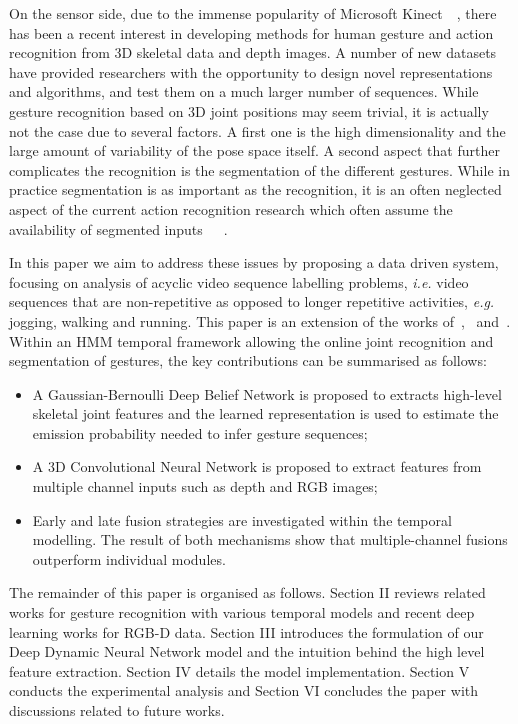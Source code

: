 On the sensor side, due to the immense popularity of Microsoft Kinect~\cite{shotton2011real}~\cite{lingshao2}, there has been a recent interest in developing methods for human gesture and action recognition from 3D skeletal data and depth images.
A number of new datasets~\cite{ICMI,fothergill2012instructing,guyon2012chalearn,wang2012mining} have provided researchers with the opportunity to design novel representations and algorithms, and test them on a much larger number of sequences.
While gesture recognition based on 3D joint positions may seem trivial, it is actually not the case due to several factors. A first one is the high dimensionality and the large amount of variability of the pose space itself.
A second aspect that further complicates the recognition is the segmentation of the different gestures. While in practice segmentation is as important as the recognition, it is an often neglected aspect of the current action recognition research which often assume the availability of segmented inputs~\cite{laptev2005space}~\cite{marszalek09}~\cite{Kuehne11}.

In this paper we aim to address these issues by proposing a data driven system, focusing on analysis of acyclic video sequence labelling problems, \emph{i.e.} video sequences that are non-repetitive as opposed to longer repetitive activities, \textit{e.g.} jogging, walking and running. This paper is an extension of the works of~\cite{diwucvpr14},~\cite{wu2014deep} and~\cite{lio2014deep}.
Within an HMM temporal framework allowing the online joint recognition and segmentation of gestures, the key contributions can be summarised as follows:
\begin{itemize}
\item A Gaussian-Bernoulli Deep Belief Network is proposed to extracts high-level skeletal joint features and the learned representation is used to estimate the emission probability needed to infer gesture sequences;
\item A 3D Convolutional Neural Network  is proposed to extract features from multiple channel inputs such as depth and  RGB images;
\item Early and late fusion strategies are investigated within the temporal modelling. The result of both mechanisms
show that multiple-channel fusions outperform individual modules.
\end{itemize}

The remainder of this paper is organised as follows. Section II reviews related works for gesture recognition with various temporal models and recent deep learning works for RGB-D data. Section III introduces the formulation of our Deep Dynamic Neural Network model and the intuition behind the high level feature extraction. Section IV details the model implementation. Section V conducts the experimental analysis and Section VI concludes the paper with discussions related to future works.


\endinput
